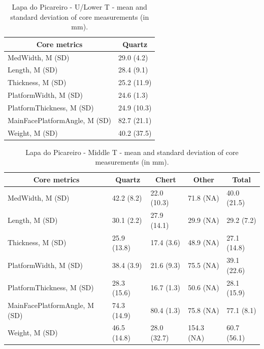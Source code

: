 \documentclass[12pt,twoside]{reedthesis}
\begin{document}
\newpage
\begin{table}[!h]

\caption{\label{tab:coremetricsLP1}Lapa do Picareiro - U/Lower T - mean and standard deviation of core measurements (in mm).}
\centering
\fontsize{9}{11}\selectfont
\begin{tabular}[t]{ll}
\toprule
\multicolumn{1}{c}{\textbf{Core metrics}} & \multicolumn{1}{c}{\textbf{Quartz}}\\
\midrule
MedWidth, M (SD) & 29.0 (4.2)\\
Length, M (SD) & 28.4 (9.1)\\
Thickness, M (SD) & 25.2 (11.9)\\
PlatformWidth, M (SD) & 24.6 (1.3)\\
PlatformThickness, M (SD) & 24.9 (10.3)\\
\addlinespace
MainFacePlatformAngle, M (SD) & 82.7 (21.1)\\
Weight, M (SD) & 40.2 (37.5)\\
\bottomrule
\end{tabular}
\end{table}
\begin{table}[!h]

\caption{\label{tab:coremetricsLP2}Lapa do Picareiro - Middle T - mean and standard deviation of core measurements (in mm).}
\centering
\fontsize{9}{11}\selectfont
\begin{tabular}[t]{lllll}
\toprule
\multicolumn{1}{c}{\textbf{Core metrics}} & \multicolumn{1}{c}{\textbf{Quartz}} & \multicolumn{1}{c}{\textbf{Chert}} & \multicolumn{1}{c}{\textbf{Other}} & \multicolumn{1}{c}{\textbf{Total}}\\
\midrule
MedWidth, M (SD) & 42.2 (8.2) & 22.0 (10.3) & 71.8 (NA) & 40.0 (21.5)\\
Length, M (SD) & 30.1 (2.2) & 27.9 (14.1) & 29.9 (NA) & 29.2 (7.2)\\
Thickness, M (SD) & 25.9 (13.8) & 17.4 (3.6) & 48.9 (NA) & 27.1 (14.8)\\
PlatformWidth, M (SD) & 38.4 (3.9) & 21.6 (9.3) & 75.5 (NA) & 39.1 (22.6)\\
PlatformThickness, M (SD) & 28.3 (15.6) & 16.7 (1.3) & 50.6 (NA) & 28.1 (15.9)\\
\addlinespace
MainFacePlatformAngle, M (SD) & 74.3 (14.9) & 80.4 (1.3) & 75.8 (NA) & 77.1 (8.1)\\
Weight, M (SD) & 46.5 (14.8) & 28.0 (32.7) & 154.3 (NA) & 60.7 (56.1)\\
\bottomrule
\end{tabular}
\end{table}
\newpage
\end{document}
